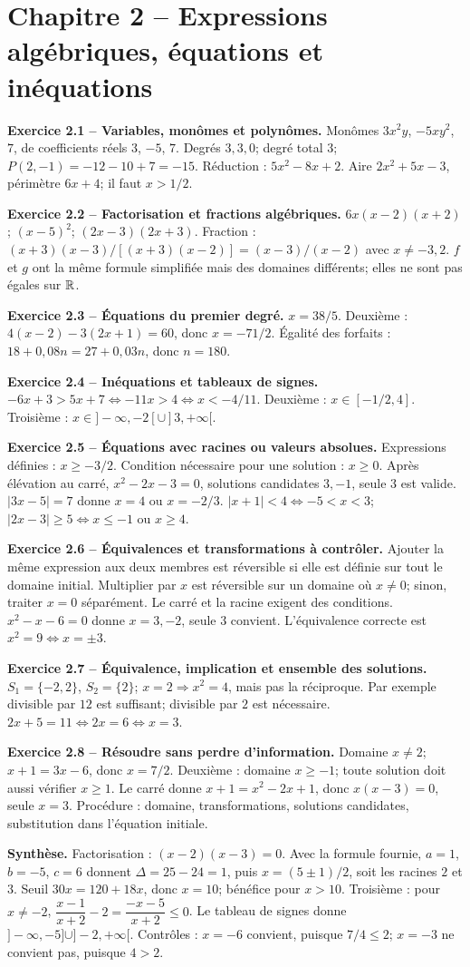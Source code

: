 \chapter*{Chapitre 2 -- Expressions algébriques, équations et inéquations}
\begin{answerbox}
\textbf{Exercice 2.1 -- Variables, monômes et polynômes.} Monômes $3x^2y$, $-5xy^2$, $7$, de coefficients réels $3$, $-5$, $7$. Degrés $3,3,0$; degré total $3$; $P(2,-1)=-12-10+7=-15$. Réduction : $5x^2-8x+2$. Aire $2x^2+5x-3$, périmètre $6x+4$; il faut $x>1/2$.\par
\textbf{Exercice 2.2 -- Factorisation et fractions algébriques.} $6x(x-2)(x+2)$; $(x-5)^2$; $(2x-3)(2x+3)$. Fraction : $(x+3)(x-3)/[(x+3)(x-2)]=(x-3)/(x-2)$ avec $x\neq-3,2$. $f$ et $g$ ont la même formule simplifiée mais des domaines différents; elles ne sont pas égales sur $\mathbb{R}$.\par
\textbf{Exercice 2.3 -- Équations du premier degré.} $x=38/5$. Deuxième : $4(x-2)-3(2x+1)=60$, donc $x=-71/2$. Égalité des forfaits : $18+0{,}08n=27+0{,}03n$, donc $n=180$.\par
\textbf{Exercice 2.4 -- Inéquations et tableaux de signes.} $-6x+3>5x+7\iff-11x>4\iff x<-4/11$. Deuxième : $x\in[-1/2,4]$. Troisième : $x\in]-\infty,-2[\cup]3,+\infty[$.\par
\textbf{Exercice 2.5 -- Équations avec racines ou valeurs absolues.} Expressions définies : $x\ge-3/2$. Condition nécessaire pour une solution : $x\ge0$. Après élévation au carré, $x^2-2x-3=0$, solutions candidates $3,-1$, seule $3$ est valide. $|3x-5|=7$ donne $x=4$ ou $x=-2/3$. $|x+1|<4\iff-5<x<3$; $|2x-3|\ge5\iff x\le-1$ ou $x\ge4$.\par
\textbf{Exercice 2.6 -- Équivalences et transformations à contrôler.} Ajouter la même expression aux deux membres est réversible si elle est définie sur tout le domaine initial. Multiplier par $x$ est réversible sur un domaine où $x\neq0$; sinon, traiter $x=0$ séparément. Le carré et la racine exigent des conditions. $x^2-x-6=0$ donne $x=3,-2$, seule $3$ convient. L'équivalence correcte est $x^2=9\iff x=\pm3$.\par
\textbf{Exercice 2.7 -- Équivalence, implication et ensemble des solutions.} $S_1=\{-2,2\}$, $S_2=\{2\}$; $x=2\Rightarrow x^2=4$, mais pas la réciproque. Par exemple divisible par $12$ est suffisant; divisible par $2$ est nécessaire. $2x+5=11\iff2x=6\iff x=3$.\par
\textbf{Exercice 2.8 -- Résoudre sans perdre d'information.} Domaine $x\neq2$; $x+1=3x-6$, donc $x=7/2$. Deuxième : domaine $x\ge-1$; toute solution doit aussi vérifier $x\ge1$. Le carré donne $x+1=x^2-2x+1$, donc $x(x-3)=0$, seule $x=3$. Procédure : domaine, transformations, solutions candidates, substitution dans l'équation initiale.\par
\medskip\textbf{Synthèse.} Factorisation : $(x-2)(x-3)=0$. Avec la formule fournie, $a=1$, $b=-5$, $c=6$ donnent $\Delta=25-24=1$, puis $x=(5\pm1)/2$, soit les racines $2$ et $3$. Seuil $30x=120+18x$, donc $x=10$; bénéfice pour $x>10$. Troisième : pour $x\ne-2$, $\dfrac{x-1}{x+2}-2=\dfrac{-x-5}{x+2}\le0$. Le tableau de signes donne $]-\infty,-5]\cup]-2,+\infty[$. Contrôles : $x=-6$ convient, puisque $7/4\le2$; $x=-3$ ne convient pas, puisque $4>2$.
\end{answerbox}
